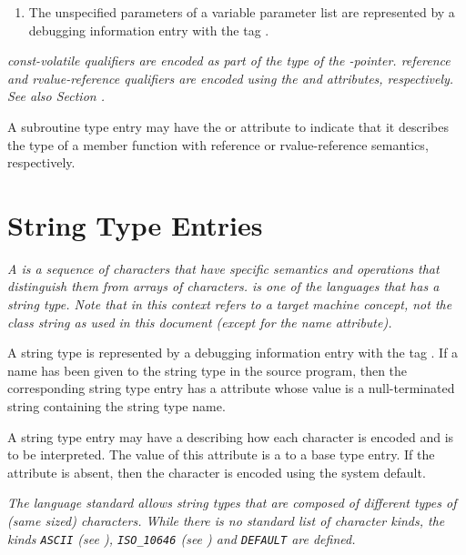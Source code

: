 {\begin{enumerate}[1. ]
\item The unspecified parameters of a variable parameter list
are 
represented by a debugging information entry with the
tag \DWTAGunspecifiedparameters.
\end{enumerate}

\textit{ const-volatile qualifiers are encoded as 
part of the type of the -pointer.
 reference and rvalue-reference qualifiers are 
encoded using the \DWATreference{} and \DWATrvaluereference{} attributes, 
respectively. 
See also Section .}

A subroutine type entry may have the \DWATreference{} or
\DWATrvaluereference{} attribute to indicate that it describes the
type of a member function with reference or rvalue-reference 
semantics, respectively.

\section{String Type Entries}
\label{chap:stringtypeentries}

\textit{A  is a sequence of characters that have specific
semantics and operations that distinguish them from arrays of
characters. 
 is one of the languages that has a string
type. Note that  in this context refers to a target
machine concept, not the class string as used in this document
(except for the name attribute).}

A string type is represented by a debugging information entry
with the tag \DWTAGstringtypeTARG. 
If a name has been given to
the string type in the source program, then the corresponding
string type entry has a 
\DWATname{} attribute
whose value is a null-terminated string containing the string type name.

A string type entry may have a \DWATtypeDEFN{} 
describing how each character is encoded and is to be interpreted.  
The value of this attribute is a \CLASSreference{} to a 
\DWTAGbasetype{} base type entry.  If the attribute is absent, 
then the character is encoded using the system default.

\textit{The 
 language standard allows string 
types that are composed of different types of (same sized) characters. 
While there is no standard list of character kinds, the kinds
\texttt{ASCII} (see \DWATEASCII), 
\texttt{ISO\_10646}
(see \DWATEUCS) and 
\texttt{DEFAULT}
are defined.}

}
